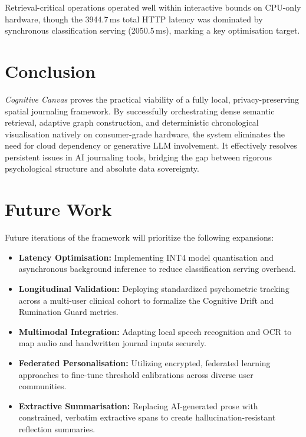 \documentclass[12pt]{article}
\newcommand{\CC}{\textit{Cognitive Canvas}}
\begin{document}
Retrieval-critical operations operated well within interactive bounds on CPU-only hardware, though the 3944.7\,ms total HTTP latency was dominated by synchronous classification serving (2050.5\,ms), marking a key optimisation target.

\section{Conclusion}

\CC{} proves the practical viability of a fully local, privacy-preserving spatial journaling framework. By successfully orchestrating dense semantic retrieval, adaptive graph construction, and deterministic chronological visualisation natively on consumer-grade hardware, the system eliminates the need for cloud dependency or generative LLM involvement. It effectively resolves persistent issues in AI journaling tools, bridging the gap between rigorous psychological structure and absolute data sovereignty.

\section{Future Work}

Future iterations of the framework will prioritize the following expansions:
\begin{itemize}
    \item \textbf{Latency Optimisation:} Implementing INT4 model quantisation and asynchronous background inference to reduce classification serving overhead.
    \item \textbf{Longitudinal Validation:} Deploying standardized psychometric tracking across a multi-user clinical cohort to formalize the Cognitive Drift and Rumination Guard metrics.
    \item \textbf{Multimodal Integration:} Adapting local speech recognition and OCR to map audio and handwritten journal inputs securely.
    \item \textbf{Federated Personalisation:} Utilizing encrypted, federated learning approaches to fine-tune threshold calibrations across diverse user communities.
    \item \textbf{Extractive Summarisation:} Replacing AI-generated prose with constrained, verbatim extractive spans to create hallucination-resistant reflection summaries.
\end{itemize}
\end{document}
